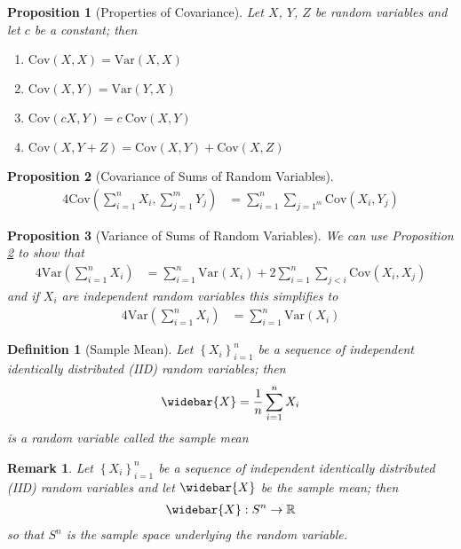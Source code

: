 \documentclass[11pt, oneside]{book}   	%
\newtheorem{definition}{Definition}[chapter]
\newtheorem{remark}{Remark}[chapter]
\newtheorem{proposition}{Proposition}[chapter]
\newcommand{\set}[1]{\left\{#1\right\}}
\newcommand{\var}[1]{\mathrm{Var}\left(#1\right)}
\newcommand{\cov}[1]{\mathrm{Cov}\left(#1\right)}
\begin{document}
\begin{proposition}[Properties of Covariance]
	Let $X$, $Y$, $Z$ be random variables and let $c$ be a constant; then
	\begin{enumerate}
		\item $\cov{X, X}=\var{X, X}$
		\item $\cov{X, Y}=\var{Y, X}$
		\item $\cov{cX, Y}=c~\cov{X, Y}$
		\item $\cov{X, Y+Z}=\cov{X, Y}+\cov{X, Z}$
	\end{enumerate}
\end{proposition}

\begin{proposition}[Covariance of Sums of Random Variables]\label{Prop:2.1}
\begin{alignat}{4}
	\cov{\sum_{i=1}^nX_i, \sum_{j=1}^mY_j}&=\sum_{i=1}^n\sum_{j=1^m}\cov{X_i, Y_j}
\end{alignat}
\end{proposition}

\begin{proposition}[Variance of Sums of Random Variables]
	We can use Proposition \ref{Prop:2.1} to show that 
	\begin{alignat}{4}
		\var{\sum_{i=1}^n X_i}&=\sum_{i=1}^n\var{X_i}+2\sum_{i=1}^n\sum_{j<i}\cov{X_i, X_j}
	\end{alignat}
	and if $X_i$ are independent random variables this simplifies to 
	\begin{alignat}{4}
		\var{\sum_{i=1}^n X_i}&=\sum_{i=1}^n\var{X_i}
	\end{alignat}
\end{proposition}

\begin{definition}[Sample Mean]
	Let $\set{X_i}_{i=1}^n$ be a sequence of independent identically distributed \emph{(IID)} random variables; then 
	\begin{alignat}{4}
		\widebar{X}=\frac{1}{n}\sum_{i=1}^n X_i
	\end{alignat}
	is a random variable called the \emph{sample mean}
\end{definition}

\begin{remark}
	Let $\set{X_i}_{i=1}^n$ be a sequence of independent identically distributed \emph{(IID)} random variables and let $\widebar{X}$ be the sample mean; then 
	\begin{alignat}{4}
		\widebar{X}:S^n\to \mathbb{R}
	\end{alignat}
	so that $S^n$ is the sample space underlying the random variable. 
\end{remark}
\end{document}
